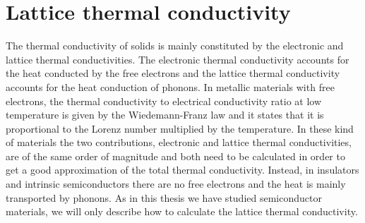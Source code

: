 
\chapter{Lattice thermal conductivity} %

\label{Chapter4} %


The thermal conductivity of solids is mainly constituted by the electronic and lattice thermal conductivities\cite{tritt2005thermal}. The electronic thermal conductivity accounts for the heat conducted by the free 
electrons and the lattice thermal conductivity accounts for the heat conduction of phonons. In metallic materials with free electrons, the thermal conductivity to electrical conductivity ratio at low temperature is given by the 
Wiedemann-Franz law and it states that it is proportional to the Lorenz number multiplied by the temperature\cite{ashcroft1976solid}. In these kind of materials the two contributions, electronic and lattice thermal conductivities, are 
of the same order of magnitude and both need to be calculated in order to get a good approximation of the total 
thermal conductivity. Instead, in insulators and  intrinsic semiconductors there are no free electrons and the 
heat is mainly transported by phonons. As in this thesis we have studied semiconductor materials, we will only describe how to calculate the lattice thermal conductivity. \\
 
